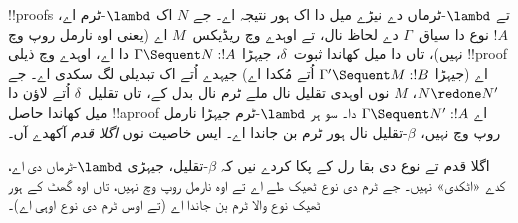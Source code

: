 \documentclass[../../../include/open-logic-section]{subfiles}
\begin{document}
!!{proof}s تے $\lambd$-ٹرماں دے نیڑے میل دا اک ہور نتیجہ اے۔ جے $N$ اک $\lambd$-ٹرم اے، $!A$ نوع دا سیاق~$\Gamma$ دے لحاظ نال، تے اوہدے وچ ریڈیکس~$M$ اے (یعنی اوہ نارمل روپ وچ نہیں)، تاں  دا میل کھاندا ثبوت~$\delta$، جیہڑا $ \Gamma \Sequent N : !A$ دا اے، اوہدے وچ ذیلی !!{proof} اے (جیہڑا $ \Gamma'
\Sequent M: !B$ اُتے مُکدا اے) جیہدے اُتے اک تبدیلی لگ سکدی اے۔ جے $N \redone
N'$، $M$ نوں اوہدی تقلیل نال ملے ٹرم نال بدل کے، تاں تقلیل~$\delta$ اُتے لاؤن دا میل کھاندا حاصل !!a{proof} اے $ \Gamma \Sequent
N' : !A$ دا۔ سو ہر $\lambd$-ٹرم جیہڑا نارمل روپ وچ نہیں، $\beta$-تقلیل نال ہور ٹرم بن جاندا اے۔ ایس خاصیت نوں \emph{اگلا قدم} آکھدے آں۔

اگلا قدم تے نوع دی بقا رل کے پکا کردے نیں کہ $\beta$-تقلیل، جیہڑی $\lambd$-ٹرماں دی اے، کدے «اٹکدی» نہیں۔ جے ٹرم دی نوع ٹھیک طے اے تے اوہ نارمل روپ وچ نہیں، تاں اوہ گھٹ کے ہور ٹھیک نوع والا ٹرم بن جاندا اے (تے اوس ٹرم دی نوع اوہی اے)۔
\end{document}
